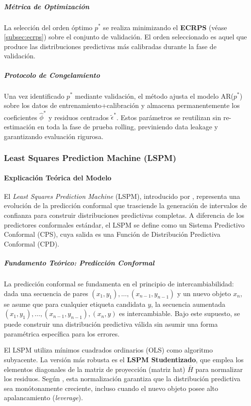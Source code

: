 \subparagraph{Métrica de Optimización}
La selección del orden óptimo $p^*$ se realiza minimizando el \textbf{ECRPS} (véase \ref{subsec:ecrps}) sobre el conjunto de validación. El orden seleccionado es aquel que produce las distribuciones predictivas más calibradas durante la fase de validación.

\subparagraph{Protocolo de Congelamiento}
Una vez identificado $p^*$ mediante validación, el método ajusta el modelo AR($p^*$) sobre los datos de entrenamiento+calibración y almacena permanentemente los coeficientes $\hat{\phi}^*$ y residuos centrados $\tilde{\epsilon}^*$. Estos parámetros se reutilizan sin re-estimación en toda la fase de prueba rolling, previniendo data leakage y garantizando evaluación rigurosa.


\subsubsection{Least Squares Prediction Machine (LSPM)}
\label{subsec:LSPM}
\paragraph{Explicación Teórica del Modelo}

El \textit{Least Squares Prediction Machine} (LSPM), introducido por \textcite{Vovk2022}, representa una evolución de la predicción conformal que trasciende la generación de intervalos de confianza para construir distribuciones predictivas completas. A diferencia de los predictores conformales estándar, el LSPM se define como un Sistema Predictivo Conformal (CPS), cuya salida es una Función de Distribución Predictiva Conformal (CPD).

\subparagraph{Fundamento Teórico: Predicción Conformal}
La predicción conformal se fundamenta en el principio de intercambiabilidad: dada una secuencia de pares $(x_1, y_1), \dots, (x_{n-1}, y_{n-1})$ y un nuevo objeto $x_n$, se asume que para cualquier etiqueta candidata $y$, la secuencia aumentada $(x_1, y_1), \dots, (x_{n-1}, y_{n-1}), (x_n, y)$ es intercambiable. Bajo este supuesto, se puede construir una distribución predictiva válida sin asumir una forma paramétrica específica para los errores.

El LSPM utiliza mínimos cuadrados ordinarios (OLS) como algoritmo subyacente. La versión más robusta es el \textbf{LSPM Studentizado}, que emplea los elementos diagonales de la matriz de proyección (matriz hat) $\bar{H}$ para normalizar los residuos. Según \textcite{Vovk2022}, esta normalización garantiza que la distribución predictiva sea monótonamente creciente, incluso cuando el nuevo objeto posee alto apalancamiento (\textit{leverage}).

